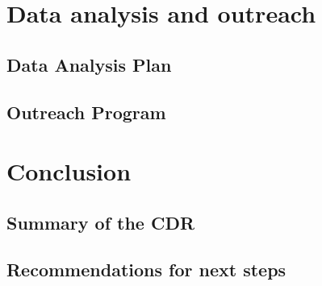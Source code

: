 \documentclass[11pt]{article}
\begin{document}
\section{Data analysis and outreach}

\subsection{Data Analysis Plan}

\subsection{Outreach Program}




\section{Conclusion}

\subsection{Summary of the CDR}

\subsection{Recommendations for next steps}
\end{document}
